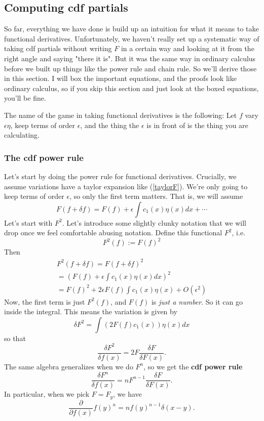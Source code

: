 \documentclass{book}
\begin{document}
\subsection{Computing cdf partials}
So far, everything we have done is build up an intuition for what it means to take functional derivatives. Unfortunately, we haven't really set up a systematic way of taking cdf partials without writing $F$ in a certain way and looking at it from the right angle and saying "there it is". But it was the same way in ordinary calculus before we built up things like the power rule and chain rule. So we'll derive those in this section. I will box the important equations, and the proofs look like ordinary calculus, so if you skip this section and just look at the boxed equations, you'll be fine.

The name of the game in taking functional derivatives is the following: Let $f$ vary $\epsilon \eta$, keep terms of order $\epsilon$, and the thing the $\epsilon$ is in front of is the thing you are calculating.

\subsubsection{The cdf power rule}
Let's start by doing the power rule for functional derivatives. Crucially, we assume variations have a taylor expansion like (\ref{taylorF}). We're only going to keep terms of order $\epsilon$, so only the first term matters. That is, we will assume
\begin{equation} \label{varF}
F(f + \delta f) = F(f) + \epsilon \int c_1 (x) \eta(x) dx + \cdots 
\end{equation}
Let's start with $F^2$. Let's introduce some slightly clunky notation that we will drop once we feel comfortable abusing notation. Define this functional $F^2$, i.e.
\[
F^2(f) := F(f)^2
\]
Then
\begin{align*}
F^2(f + \delta f) = F(f + \delta f)^2 \\ =
\left(F(f) + \epsilon \int c_1 (x) \eta(x) dx \right)^2 \\ =
F(f)^2 + 2\epsilon F(f) \int c_1 (x) \eta(x) + O(\epsilon^2)
\end{align*}
Now, the first term is just $F^2(f)$, and $F(f)$ is \textit{just a number}. So it can go inside the integral. This means the variation is given by
\[
\delta F^2 = \int \left( 2 F(f) c_1 (x) \right) \eta(x) dx
\]
so that
\[
\frac{\delta F^2}{\delta f(x)} = 2F \frac{\delta F}{\delta F(x)}.
\]
The same algebra generalizes when we do $F^n$, so we get the \textbf{cdf power rule}
\begin{equation} \label{cdfpower}
\boxed{\frac{\delta F^n}{\delta f(x)} = n F^{n-1} \frac{\delta F}{\delta F(x)}.}
\end{equation}
In particular, when we pick $F = F_y$, we have
\[
\frac{\partial}{\partial f(x)} f(y)^n = n f(y)^{n-1} \delta(x-y).
\]
\end{document}
